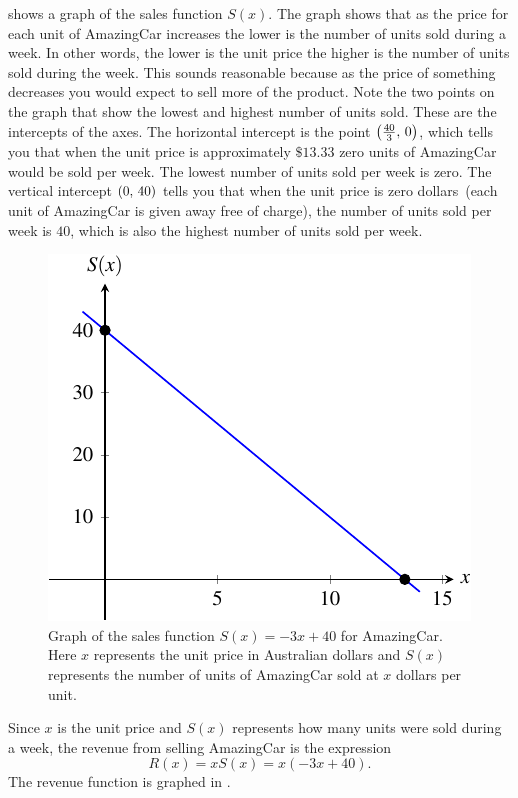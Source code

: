 \documentclass[a4paper,oneside,12pt]{article}
\begin{document}
\begin{solution}
 shows a graph of the sales function
$S(x)$.  The graph shows that as the price for each unit of AmazingCar
increases the lower is the number of units sold during a week.  In
other words, the lower is the unit price the higher is the number of
units sold during the week.  This sounds reasonable because as the
price of something decreases you would expect to sell more of the
product.  Note the two points on the graph that show the lowest and
highest number of units sold.  These are the intercepts of the axes.
The horizontal intercept is the point $\left\lparen{\frac{40}{3}},\, {0}\right\rparen$, which
tells you that when the unit price is approximately $\$13.33$ zero
units of AmazingCar would be sold per week.  The lowest number of
units sold per week is zero.  The vertical intercept $\left\lparen{0},\, {40}\right\rparen$
tells you that when the unit price is zero dollars~(each unit of
AmazingCar is given away free of charge), the number of units sold per
week is $40$, which is also the highest number of units sold per
week.

\begin{figure}[!htbp]
\centering
\includegraphics[scale=1.1]{image/10/amazingcar-sales.pdf}
\caption{%
  Graph of the sales function $S(x) = -3x + 40$ for AmazingCar.  Here
  $x$ represents the unit price in Australian dollars and $S(x)$
  represents the number of units of AmazingCar sold at $x$ dollars
  per unit.
}
\label{fig:AmazingCar_sales}
\end{figure}

Since $x$ is the unit price and $S(x)$ represents how many units were
sold during a week, the revenue from selling AmazingCar is the
expression
\[
R(x)
=
x S(x)
=
x(-3x + 40).
\]
The revenue function is graphed in .


\end{solution}
\end{document}
